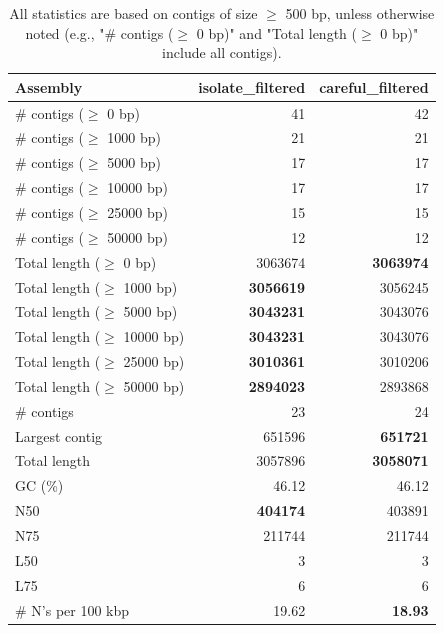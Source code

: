 \documentclass[12pt,a4paper]{article}
\begin{document}
\begin{table}[ht]
\begin{center}
\caption{All statistics are based on contigs of size $\geq$ 500 bp, unless otherwise noted (e.g., "\# contigs ($\geq$ 0 bp)" and "Total length ($\geq$ 0 bp)" include all contigs).}
\begin{tabular}{|l*{2}{|r}|}
\hline
Assembly & isolate\_filtered & careful\_filtered \\ \hline
\# contigs ($\geq$ 0 bp) & 41 & 42 \\ \hline
\# contigs ($\geq$ 1000 bp) & 21 & 21 \\ \hline
\# contigs ($\geq$ 5000 bp) & 17 & 17 \\ \hline
\# contigs ($\geq$ 10000 bp) & 17 & 17 \\ \hline
\# contigs ($\geq$ 25000 bp) & 15 & 15 \\ \hline
\# contigs ($\geq$ 50000 bp) & 12 & 12 \\ \hline
Total length ($\geq$ 0 bp) & 3063674 & {\bf 3063974} \\ \hline
Total length ($\geq$ 1000 bp) & {\bf 3056619} & 3056245 \\ \hline
Total length ($\geq$ 5000 bp) & {\bf 3043231} & 3043076 \\ \hline
Total length ($\geq$ 10000 bp) & {\bf 3043231} & 3043076 \\ \hline
Total length ($\geq$ 25000 bp) & {\bf 3010361} & 3010206 \\ \hline
Total length ($\geq$ 50000 bp) & {\bf 2894023} & 2893868 \\ \hline
\# contigs & 23 & 24 \\ \hline
Largest contig & 651596 & {\bf 651721} \\ \hline
Total length & 3057896 & {\bf 3058071} \\ \hline
GC (\%) & 46.12 & 46.12 \\ \hline
N50 & {\bf 404174} & 403891 \\ \hline
N75 & 211744 & 211744 \\ \hline
L50 & 3 & 3 \\ \hline
L75 & 6 & 6 \\ \hline
\# N's per 100 kbp & 19.62 & {\bf 18.93} \\ \hline
\end{tabular}
\end{center}
\end{table}
\end{document}
